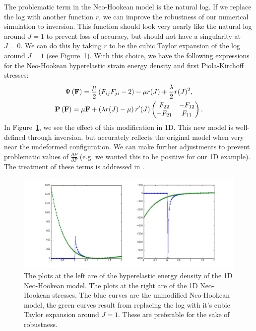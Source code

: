 The problematic term in the Neo-Hookean model is the natural log. If we replace the log with another function $r$, we can improve the robustness of our numerical simulation to inversion. This function should look very nearly like the natural log around $J = 1$ to prevent loss of accuracy, but should not have a singularity at $J = 0$. We can do this by taking $r$ to be the cubic Taylor expansion of the log around $J = 1$ (see Figure~\ref{fig:inversion3}). With this choice, we have the following expressions for the Neo-Hookean hyperelastic strain energy density and first Piola-Kirchoff stresses:
\begin{gather*}
\Psi \left( \mathbf{F} \right) = \frac{\mu}{2} \left( F_{ij} F_{ji} - 2 \right) - \mu r(J) + \frac{\lambda}{2} r(J)^2, \\
\mathbf{P} \left( \mathbf{F} \right) = \mu \mathbf{F} + \left( \lambda r(J) -\mu \right) r'(J) \begin{pmatrix} F_{22} & -F_{12} \\
-F_{21} & F_{11} \end{pmatrix}.
\end{gather*}
In Figure~\ref{fig:inversion3}, we see the effect of this modification in 1D. This new model is well-defined through inversion, but accurately reflects the original model when very near the undeformed configuration. We can make further adjustments to prevent problematic values of $\frac{\partial P}{\partial F}$ (e.g. we wanted this to be positive for our 1D example). The treatment of these terms is addressed in \cite{Teran05a}.

\begin{figure}
\includegraphics[width=\columnwidth]{images/invertible_neo_hookean}
\caption{The plots at the left are of the hyperelastic energy density of the 1D Neo-Hookean model. The plots at the right are of the 1D Neo-Hookean stresses. The blue curves are the unmodified Neo-Hookean model, the green curves result from replacing the log with it's cubic Taylor expansion around $J = 1$. These are preferable for the sake of robustness.}
\label{fig:inversion3}
\end{figure}

